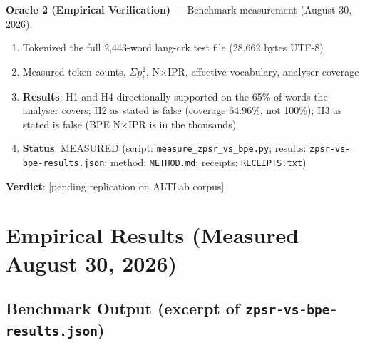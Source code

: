 \documentclass[11pt,oneside]{article}
\begin{document}
\textbf{Oracle 2 (Empirical Verification)} --- Benchmark measurement (August 30, 2026):

\begin{enumerate}
  \item Tokenized the full 2,443-word lang-crk test file (28,662 bytes UTF-8)
  \item Measured token counts, $\Sigma p_i^2$, N×IPR, effective vocabulary, analyser coverage
  \item \textbf{Results}: H1 and H4 directionally supported on the 65\% of words the analyser covers; H2 as stated is false (coverage 64.96\%, not 100\%); H3 as stated is false (BPE N×IPR is in the thousands)
  \item \textbf{Status}: MEASURED (script: \texttt{measure\_zpsr\_vs\_bpe.py}; results: \texttt{zpsr-vs-bpe-results.json}; method: \texttt{METHOD.md}; receipts: \texttt{RECEIPTS.txt})
\end{enumerate}

\textbf{Verdict}: [pending replication on ALTLab corpus]

\section{Empirical Results (Measured August 30, 2026)}

\subsection{Benchmark Output (excerpt of \texttt{zpsr-vs-bpe-results.json})}
\end{document}
